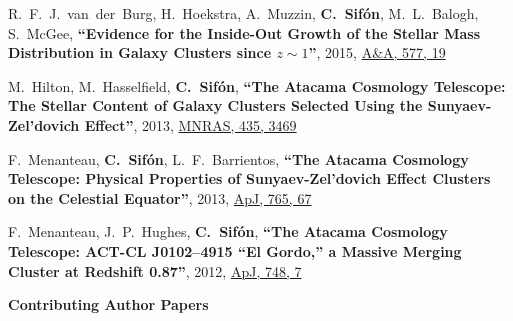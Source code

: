 \documentclass{article}
\def\myself{\textbf{\color{red} C.~Sif\'on}}
\def\aap{A\&A}
\def\apj{ApJ}
\def\mnras{MNRAS}
\newcommand{\paper}[1]{\textbf{``#1''}}
\begin{document}
\begin{etaremune}
\item
R.~F.~J.~van~der~Burg, H.~Hoekstra, A.~Muzzin, \myself, M.~L.~Balogh, S.~McGee,
\paper{Evidence for the Inside-Out Growth of the Stellar Mass Distribution in Galaxy Clusters 
since $z\sim1$},
2015, \href{http://adsabs.harvard.edu/adsabs/abs/2015A&A...577A..19V}{\aap, 577, 19}

\item
M.~Hilton, M.~Hasselfield, \myself, 
\paper{The Atacama Cosmology Telescope: The Stellar Content of Galaxy Clusters Selected Using the 
Sunyaev-Zel'dovich Effect},
2013, \href{https://ui.adsabs.harvard.edu/#abs/2013MNRAS.435.3469H/abstract}{\mnras, 435, 3469}

\item
F.~Menanteau, \myself, L.~F.~Barrientos, 
\paper{The Atacama Cosmology Telescope: Physical Properties of Sunyaev-Zel'dovich Effect Clusters 
on the Celestial Equator},
2013, \href{https://ui.adsabs.harvard.edu/#abs/2013ApJ...765...67M/abstract}{\apj, 765, 67}

\item
F.~Menanteau, J.~P.~Hughes, \myself, 
\paper{The Atacama Cosmology Telescope: ACT-CL J0102--4915 ``El Gordo,'' a Massive
Merging Cluster at Redshift 0.87},
2012, \href{https://ui.adsabs.harvard.edu/#abs/2012ApJ...748....7M/abstract}{\apj, 748, 7}

\end{etaremune}




\vspace{0.4cm}
\noindent
{\bf\Large Contributing Author Papers}\\
\end{document}
